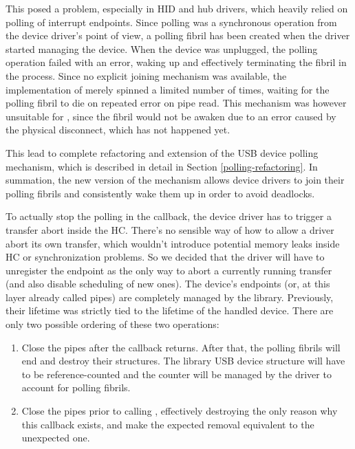 This posed a problem, especially in HID and hub drivers, which heavily relied on
polling of interrupt endpoints. Since polling was a synchronous operation from
the device driver's point of view, a polling fibril has been created when the
driver started managing the device. When the device was unplugged, the polling
operation failed with an error, waking up and effectively terminating the fibril in
the process. Since no explicit joining mechanism was available, the
implementation of  merely spinned a limited number of times,
waiting for the polling fibril to die on repeated error on pipe read. This mechanism was however unsuitable for
, since the fibril would not be awaken due to an error caused
by the physical disconnect, which has not happened yet.

This lead to complete refactoring and extension of the USB device polling
mechanism, which is described in detail in Section \ref{polling-refactoring}.
In summation, the new version of the mechanism allows device drivers to join
their polling fibrils and consistently wake them up in order to avoid deadlocks.

To actually stop the polling in the  callback, the device
driver has to trigger a transfer abort inside the HC. There's no sensible way
of how to allow a driver abort its own transfer, which wouldn't introduce
potential memory leaks inside HC or synchronization problems. So we decided
that the driver will have to unregister the endpoint as the only way to abort
a currently running transfer (and also disable scheduling of new ones). The
device's endpoints (or, at this layer already called pipes) are completely
managed by the  library. Previously, their lifetime was strictly
tied to the lifetime of the handled device. There are only two possible
ordering of these two operations:

\begin{enumerate}
	\item Close the pipes after the  callback returns.
		After that, the polling fibrils will end and destroy their structures.
		The library USB device structure will have to be reference-counted and
		the counter will be managed by the driver to account for polling
		fibrils.

	\item Close the pipes prior to calling , effectively
		destroying the only reason why this callback exists, and make the
		expected removal equivalent to the unexpected one.
\end{enumerate}

